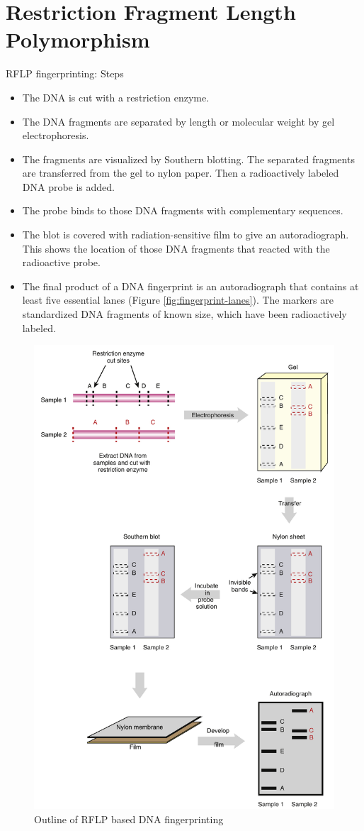 \documentclass[
  ignorenonframetext,
  aspectratio=169]{beamer}
\providecommand{\tightlist}{%
  \setlength{\itemsep}{0pt}\setlength{\parskip}{0pt}}
\begin{document}
\hypertarget{restriction-fragment-length-polymorphism}{%
\section{Restriction Fragment Length
Polymorphism}\label{restriction-fragment-length-polymorphism}}

\begin{frame}{RFLP fingerprinting: Steps}
\protect\hypertarget{rflp-fingerprinting-steps}{}
\begin{itemize}
\tightlist
\item
  The DNA is cut with a restriction enzyme.
\item
  The DNA fragments are separated by length or molecular weight by gel
  electrophoresis.
\item
  The fragments are visualized by Southern blotting. The separated
  fragments are transferred from the gel to nylon paper. Then a
  radioactively labeled DNA probe is added.
\item
  The probe binds to those DNA fragments with complementary sequences.
\item
  The blot is covered with radiation-sensitive film to give an
  autoradiograph. This shows the location of those DNA fragments that
  reacted with the radioactive probe.
\item
  The final product of a DNA fingerprint is an autoradiograph that
  contains at least five essential lanes (Figure
  \ref{fig:fingerprint-lanes}). The markers are standardized DNA
  fragments of known size, which have been radioactively labeled.
\end{itemize}
\end{frame}

\begin{frame}{}
\protect\hypertarget{section-4}{}
\begin{figure}
\includegraphics[width=0.3\linewidth]{../images/rflp_fingerprinting} \caption{Outline of RFLP based DNA fingerprinting}\label{fig:rflp-fingerprinting}
\end{figure}
\end{frame}
\end{document}
